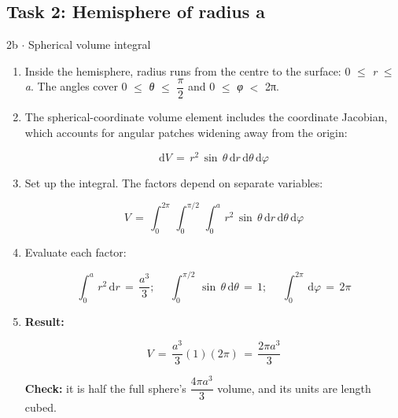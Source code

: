 \documentclass[11pt]{article}
\begin{document}
\begin{keepsection}\subsection{Task 2: Hemisphere of radius a}

\begin{workedbox}{2b \ensuremath{\cdot} Spherical volume integral}
\begin{enumerate}
\item Inside the hemisphere, radius runs from the centre to the surface: 0 \ensuremath{\leq} \textit{r} \ensuremath{\leq} \textit{a}. The angles cover 0 \ensuremath{\leq} \textit{θ} \ensuremath{\leq} {\small\ensuremath{\dfrac{π}{2}}} and 0 \ensuremath{\leq} \textit{φ} \ensuremath{<} 2π.
\item {}
The spherical-coordinate volume element includes the coordinate Jacobian, which accounts for angular patches widening away from the origin:

\begin{equation*}\mathrm{d}{V}\, =\, {r}^{2}\, \sin \, {θ}\, \mathrm{d}{r}\, \mathrm{d}{θ}\, \mathrm{d}{φ}\end{equation*}
\item {}
Set up the integral. The factors depend on separate variables:

\begin{equation*}{V}\, =\, \int_{0}^{2π} \, \int_{0}^{π/2} \, \int_{0}^{{a}} \, {r}^{2}\, \sin \, {θ}\, \mathrm{d}{r}\, \mathrm{d}{θ}\, \mathrm{d}{φ}\end{equation*}
\item {}
Evaluate each factor:

\begin{equation*}\int_{0}^{{a}} \, {r}^{2}\, \mathrm{d}{r}\, =\, \dfrac{{a}^{3}}{3};\, \quad \, \int_{0}^{π/2} \, \sin \, {θ}\, \mathrm{d}{θ}\, =\, 1;\, \quad \, \int_{0}^{2π} \, \mathrm{d}{φ}\, =\, 2π\end{equation*}
\item {}
\textbf{Result:}

\begin{equation*}{V}\, =\, \dfrac{{a}^{3}}{3}(1)(2π)\, =\, \dfrac{2π{a}^{3}}{3}\end{equation*}

\textbf{Check:} it is half the full sphere’s {\small\ensuremath{\dfrac{4π{a}^{3}}{3}}} volume, and its units are length cubed.
\end{enumerate}
\end{workedbox}

\end{keepsection}
\end{document}
